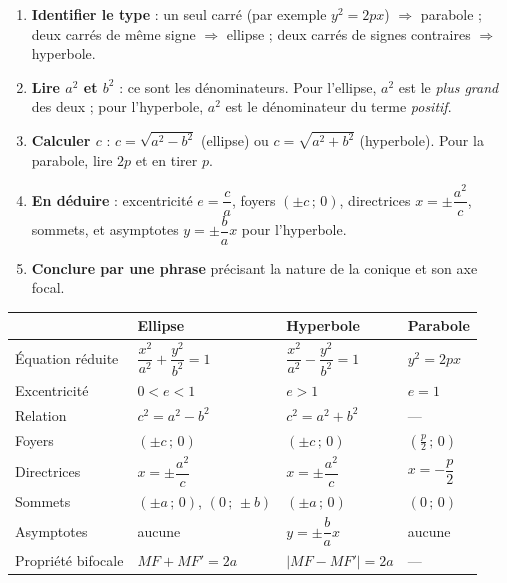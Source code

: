 \documentclass[11pt]{article}
\begin{document}
\begin{methode}
\begin{enumerate}
\item \textbf{Identifier le type} : un seul carré (par exemple $y^2 = 2px$) $\Rightarrow$ parabole ; deux carrés de même signe $\Rightarrow$ ellipse ; deux carrés de signes contraires $\Rightarrow$ hyperbole.
\item \textbf{Lire $a^2$ et $b^2$} : ce sont les dénominateurs. Pour l'ellipse, $a^2$ est le \emph{plus grand} des deux ; pour l'hyperbole, $a^2$ est le dénominateur du terme \emph{positif}.
\item \textbf{Calculer $c$} : $c = \sqrt{a^2 - b^2}$ (ellipse) ou $c = \sqrt{a^2 + b^2}$ (hyperbole). Pour la parabole, lire $2p$ et en tirer $p$.
\item \textbf{En déduire} : excentricité $e = \dfrac{c}{a}$, foyers $(\pm c\,;\,0)$, directrices $x = \pm \dfrac{a^2}{c}$, sommets, et asymptotes $y = \pm \dfrac{b}{a}x$ pour l'hyperbole.
\item \textbf{Conclure par une phrase} précisant la nature de la conique et son axe focal.
\end{enumerate}
\end{methode}

\begin{aretenir}
\begin{center}
\begin{tabularx}{\linewidth}{|l|X|X|X|}
\hline
\rowcolor{popblueL} & \textbf{Ellipse} & \textbf{Hyperbole} & \textbf{Parabole} \\
\hline
Équation réduite & $\dfrac{x^2}{a^2}+\dfrac{y^2}{b^2}=1$ & $\dfrac{x^2}{a^2}-\dfrac{y^2}{b^2}=1$ & $y^2 = 2px$ \\
\hline
Excentricité & $0 < e < 1$ & $e > 1$ & $e = 1$ \\
\hline
Relation & $c^2 = a^2 - b^2$ & $c^2 = a^2 + b^2$ & --- \\
\hline
Foyers & $(\pm c\,;\,0)$ & $(\pm c\,;\,0)$ & $\left(\frac{p}{2}\,;\,0\right)$ \\
\hline
Directrices & $x = \pm\dfrac{a^2}{c}$ & $x = \pm\dfrac{a^2}{c}$ & $x = -\dfrac{p}{2}$ \\
\hline
Sommets & $(\pm a\,;\,0)$, $(0\,;\,\pm b)$ & $(\pm a\,;\,0)$ & $(0\,;\,0)$ \\
\hline
Asymptotes & aucune & $y = \pm\dfrac{b}{a}x$ & aucune \\
\hline
Propriété bifocale & $MF+MF' = 2a$ & $|MF - MF'| = 2a$ & --- \\
\hline
\end{tabularx}
\end{center}
\end{aretenir}
\end{document}
